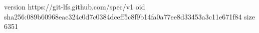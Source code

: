 version https://git-lfs.github.com/spec/v1
oid sha256:089b60968eac324c0d7c0384dceff5c8f9b14fa0a77ee8d33453a3c11e671f84
size 6351
